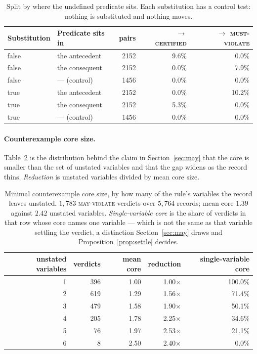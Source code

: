 \documentclass{article}
\begin{document}
\begin{table}[h]
  \centering
  \caption{Split by where the undefined predicate sits. Each substitution has a control test: nothing is substituted and nothing moves.}
  \label{tab:holepos}
  \begin{tabular}{llrrr}
    \toprule
    Substitution & Predicate sits in & pairs & $\rightarrow$ \textsc{certified} & $\rightarrow$ \textsc{must-violate} \\
    \midrule
    \textsf{false} & the antecedent & 2152 & 9.6\% & 0.0\% \\
    \textsf{false} & the consequent & 2152 & 0.0\% & 7.9\% \\
    \textsf{false} & --- (control) & 1456 & 0.0\% & 0.0\% \\
    \addlinespace
    \textsf{true} & the antecedent & 2152 & 0.0\% & 10.2\% \\
    \textsf{true} & the consequent & 2152 & 5.3\% & 0.0\% \\
    \textsf{true} & --- (control) & 1456 & 0.0\% & 0.0\% \\
    \bottomrule
  \end{tabular}
\end{table}

\paragraph{Counterexample core size.}
Table~\ref{tab:coresize} is the distribution behind the claim in
Section~\ref{sec:may} that the core is smaller than the set of unstated
variables and that the gap widens as the record thins. \emph{Reduction} is
unstated variables divided by mean core size.

\begin{table}[h]
  \centering
  \caption{Minimal counterexample core size, by how many of the rule's
  variables the record leaves unstated. $1{,}783$ \textsc{may-violate}
  verdicts over $5{,}764$ records; mean core $1.39$ against $2.42$ unstated
  variables. \emph{Single-variable core} is the share of verdicts in that row
  whose core names one variable --- which is not the same as that variable
  settling the verdict, a distinction Section~\ref{sec:may} draws and
  Proposition~\ref{prop:settle} decides.}
  \label{tab:coresize}
  \begin{tabular}{rrrrr}
    \toprule
    unstated variables & verdicts & mean core & reduction & single-variable core \\
    \midrule
    1 & 396 & 1.00 & 1.00$\times$ & 100.0\% \\
    2 & 619 & 1.29 & 1.56$\times$ & 71.4\% \\
    3 & 479 & 1.58 & 1.90$\times$ & 50.1\% \\
    4 & 205 & 1.78 & 2.25$\times$ & 34.6\% \\
    5 &  76 & 1.97 & 2.53$\times$ & 21.1\% \\
    6 &   8 & 2.50 & 2.40$\times$ & 0.0\% \\
    \bottomrule
  \end{tabular}
\end{table}
\end{document}
